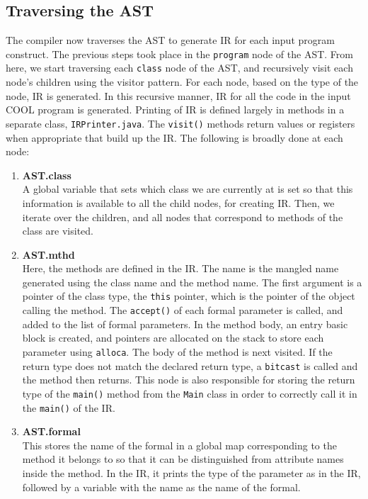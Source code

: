 \documentclass{article}
\begin{document}
\subsection{Traversing the AST}
The compiler now traverses the AST to generate IR for each input program construct. The previous steps took place in the \verb|program| node of the AST. From here, we start traversing each \verb|class| node of the AST, and recursively visit each node's children using the visitor pattern. For each node, based on the type of the node, IR is generated. In this recursive manner, IR for all the code in the input COOL program is generated. Printing of IR is defined largely in methods in a separate class, \verb|IRPrinter.java|. The \verb|visit()| methods return values or registers when appropriate that build up the IR. The following is broadly done at each node:
\begin{enumerate}
	\item \textbf{AST.class} \\
	A global variable that sets which class we are currently at is set so that this information is available to all the child nodes, for creating IR. Then, we iterate over the children, and all nodes that correspond to methods of the class are visited.
	\item \textbf{AST.mthd} \\
	Here, the methods are defined in the IR. The name is the mangled name generated using the class name and the method name. The first argument is a pointer of the class type, the \verb|this| pointer, which is the pointer of the object calling the method. The \verb|accept()| of each formal parameter is called, and added to the list of formal parameters. In the method body, an entry basic block is created, and pointers are allocated on the stack to store each parameter using \verb|alloca|. The body of the method is next visited. If the return type does not match the declared return type, a \verb|bitcast| is called and the method then returns. This node is also responsible for storing the return type of the \verb|main()| method from the \verb|Main| class in order to correctly call it in the \verb|main()| of the IR. 
	\item \textbf{AST.formal} \\
	This stores the name of the formal in a global map corresponding to the method it belongs to so that it can be distinguished from attribute names inside the method. In the IR, it prints the type of the parameter as in the IR, followed by a variable with the name as the name of the formal.

\end{enumerate}
\end{document}
